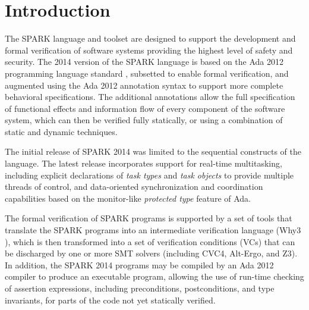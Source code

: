 \documentclass[conference,compsoc]{IEEEtran}
\begin{document}



\section{Introduction}
The SPARK language and toolset \cite{spark} are designed to support the
development and formal verification of software systems providing the
highest level of safety and security. The 2014 version of the SPARK
language is based on the Ada 2012 programming language standard \cite{lrm},
subsetted to enable formal verification, and augmented using the Ada 2012
annotation syntax to support more complete behavioral specifications. The
additional annotations allow the full specification of functional effects
and information flow of every component of the software system, which can
then be verified fully statically, or using a combination of static and
dynamic techniques.

The initial release of SPARK 2014 was limited to the sequential constructs
of the language. The latest release incorporates support for real-time
multitasking, including explicit declarations of \emph{task types} and
\emph{task objects} to provide multiple threads of control, and
data-oriented synchronization and coordination capabilities based on the
monitor-like \emph{protected type} feature of Ada.

The formal verification of SPARK programs is supported by a set of tools
that translate the SPARK programs into an intermediate verification
language (Why3 \cite{why3}), which is then transformed into a set of
verification conditions (VCs) that can be discharged by one or more SMT
solvers \cite{smt} (including CVC4, Alt-Ergo, and Z3). In addition, the
SPARK 2014 programs may be compiled by an Ada 2012 compiler to produce an
executable program, allowing the use of run-time checking of assertion
expressions, including preconditions, postconditions, and type invariants,
for parts of the code not yet statically verified.
\end{document}

